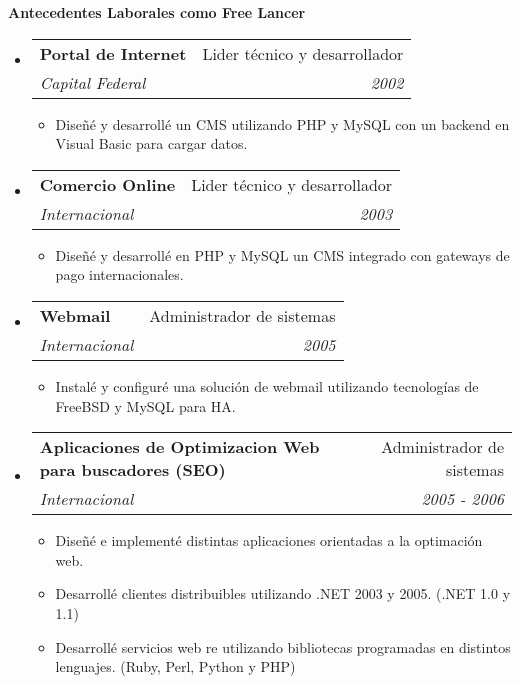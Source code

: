 \documentclass[a4paper,11pt]{article}
\makeatletter
\newcommand{\resitem}[1]{\item #1 \vspace{-2pt}}
\newcommand{\resheading}[1]{{\large \colorbox{mygrey}{\begin{minipage}{\textwidth}{\textbf{#1 \vphantom{p\^{E}}}}\end{minipage}}}}
\newcommand{\ressubheading}[4]{
\begin{tabular*}{6.3in}{l@{\extracolsep{\fill}}r}
		\textbf{#1} & #2 \\
		\textit{#3} & \textit{#4} \\
\end{tabular*}\vspace{-6pt}}
\makeatother
\begin{document}
\resheading{Antecedentes Laborales como Free Lancer}
	\begin{itemize}
		\item
			\ressubheading{ Portal de Internet } { Lider t\'ecnico y desarrollador } { Capital Federal } { 2002 }
				{ \footnotesize
					\begin{itemize}
						\resitem{ Dise\~n\'e y desarroll\'e un CMS utilizando PHP y MySQL con un backend en Visual Basic para cargar datos. }
					\end{itemize}
          		}
		\item
			\ressubheading{ Comercio Online } { Lider t\'ecnico y desarrollador } { Internacional } { 2003 }
				{ \footnotesize
					\begin{itemize}
						\resitem{ Dise\~n\'e y desarroll\'e en PHP y MySQL un CMS integrado con gateways de pago internacionales. }
					\end{itemize}
          		}
		\item
			\ressubheading{ Webmail } { Administrador de sistemas } { Internacional } { 2005 }
				{ \footnotesize
					\begin{itemize}
						\resitem{ Instal\'e y configur\'e una soluci\'on de webmail utilizando tecnolog\'ias de FreeBSD y MySQL para HA. }
					\end{itemize}
          		}
		\item
			\ressubheading{ Aplicaciones de Optimizacion Web para buscadores (SEO) } { Administrador de sistemas } { Internacional } { 2005 - 2006 }
				{ \footnotesize
					\begin{itemize}
						\resitem{ Dise\~n\'e e implement\'e distintas aplicaciones orientadas a la optimaci\'on web. }
						\resitem{ Desarroll\'e clientes distribuibles utilizando .NET 2003 y 2005.  (.NET 1.0 y 1.1) }
						\resitem{ Desarroll\'e servicios web re utilizando bibliotecas programadas en distintos lenguajes. (Ruby, Perl, Python y PHP) }
					\end{itemize}
          		}
	\end{itemize}

\end{document}

